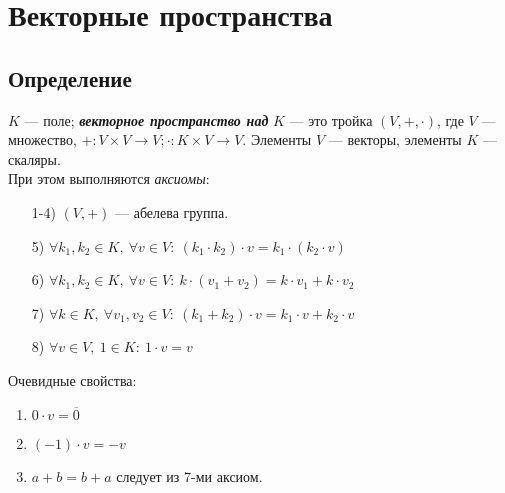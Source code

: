 \section{Векторные пространства}
\subsection{Определение}

\begin{definition} 
    $K$ — поле; \textbf{\textit{векторное пространство над}} $K$ — это 
тройка $(V,+,\cdot)$, где $V$ — множество, $+:V\times V\rightarrow V; 
\cdot :K\times V\rightarrow V$. Элементы $V$ — векторы, элементы $K$ — 
скаляры. \\
    При этом выполняются \textit{аксиомы}:
    \begin{enumerate}
        \item[1-4)] $(V,+)$ — абелева группа.
        \item[5)]  $\forall k_1, k_2\in K,\ \forall v\in V:\ (k_1\cdot 
k_2)\cdot v = k_1\cdot (k_2\cdot v)$
        \item[6)]  $\forall k_1,k_2\in K,\ \forall v\in V:\ 
k\cdot(v_1+v_2) = k\cdot v_1+ k\cdot v_2$
        \item[7)] $\forall k\in K,\ \forall v_1,v_2\in V:\ (k_1+k_2)\cdot 
v = k_1\cdot v+ k_2\cdot v$
        \item[8)] $\forall v\in V,\ 1\in K:\ 1\cdot v=v$
    \end{enumerate}
\end{definition}

\begin{remark}Очевидные свойства:
    \begin{enumerate}
        \item $0\cdot v= \overline{0}$
        \item $(-1)\cdot v=-v$
        \item $a+b=b+a$ следует из 7-ми аксиом.
    \end{enumerate}
\end{remark}

